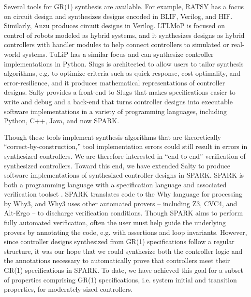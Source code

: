 \documentclass[runningheads]{llncs}
\begin{document}
Several tools for GR(1) synthesis are available. 
For example, RATSY %
\cite{bloem2010ratsy} has a focus on circuit design and synthesizes designs 
encoded in BLIF, %
Verilog, and HIF. %
Similarly, Anzu \cite{jobstmann2007anzu} produces circuit designs in Verilog.
LTLMoP 
\cite{finucane2010ltlmop} is focused on control of robots modeled as hybrid systems, 
and it synthesizes designs as hybrid controllers with handler modules to help connect controllers to simulated or real-world systems. 
TuLiP 
\cite{TuLiP2011} has a similar focus and can synthesize controller implementations in Python. 
Slugs 
\cite{Ehlers2016} is architected to allow users to tailor synthesis algorithms,
 e.g. to optimize criteria such as quick response, cost-optimality, and error-resilience, and it produces mathematical representations of controller designs.
Salty \cite{elliott2019salty} provides a front-end to Slugs that makes specifications easier to write and debug and 
a back-end that turns controller designs into executable software implementations in a variety of programming languages, 
including Python, C++, Java, and now SPARK.

Though these tools implement synthesis algorithms that are theoretically ``correct-by-construction,'' 
tool implementation errors could still result in errors in synthesized controllers. 
We are therefore interested in ``end-to-end'' verification of synthesized controllers. %
Toward this end, we have extended Salty to produce software implementations of synthesized controller designs in SPARK. 
SPARK is both a programming language with a specification language and associated verification toolset \cite{hoang2015spark}. 
SPARK translates code to the Why language for processing by Why3, 
and Why3 uses other automated provers -- including Z3, CVC4, and Alt-Ergo -- to discharge verification conditions.
Though SPARK aims to perform fully automated verification, often the user must help guide the underlying provers by
annotating the code, e.g. with assertions and loop invariants. 
However, since controller designs synthesized from GR(1) specifications follow a regular structure, it was our hope that we could 
synthesize both the controller logic and the annotations necessary to automatically prove that controllers meet their GR(1) specifications in SPARK. 
To date, we have achieved this goal for a subset of properties comprising GR(1) specifications, 
i.e. system initial and transition properties, for moderately-sized controllers.
\end{document}

